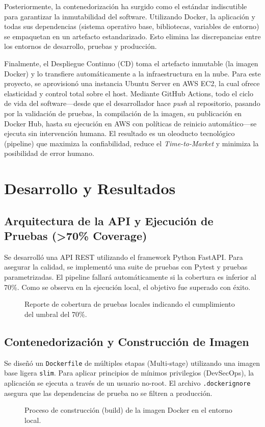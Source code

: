\documentclass[12pt, a4paper]{article}
\begin{document}
Posteriormente, la contenedorización ha surgido como el estándar indiscutible para garantizar la inmutabilidad del software. Utilizando Docker, la aplicación y todas sus dependencias (sistema operativo base, bibliotecas, variables de entorno) se empaquetan en un artefacto estandarizado. Esto elimina las discrepancias entre los entornos de desarrollo, pruebas y producción. 

Finalmente, el Despliegue Continuo (CD) toma el artefacto inmutable (la imagen Docker) y lo transfiere automáticamente a la infraestructura en la nube. Para este proyecto, se aprovisionó una instancia Ubuntu Server en AWS EC2, la cual ofrece elasticidad y control total sobre el host. Mediante GitHub Actions, todo el ciclo de vida del software—desde que el desarrollador hace \textit{push} al repositorio, pasando por la validación de pruebas, la compilación de la imagen, su publicación en Docker Hub, hasta su ejecución en AWS con políticas de reinicio automático—se ejecuta sin intervención humana. El resultado es un oleoducto tecnológico (pipeline) que maximiza la confiabilidad, reduce el \textit{Time-to-Market} y minimiza la posibilidad de error humano.

\section{Desarrollo y Resultados}

\subsection{Arquitectura de la API y Ejecución de Pruebas (>70\% Coverage)}
Se desarrolló una API REST utilizando el framework Python FastAPI. Para asegurar la calidad, se implementó una suite de pruebas con Pytest y pruebas parametrizadas. El pipeline fallará automáticamente si la cobertura es inferior al 70\%. Como se observa en la ejecución local, el objetivo fue superado con éxito.
\begin{figure}[H]
    \centering
    \caption{Reporte de cobertura de pruebas locales indicando el cumplimiento del umbral del 70\%.}
    \label{fig:coverage}
\end{figure}

\subsection{Contenedorización y Construcción de Imagen}
Se diseñó un \texttt{Dockerfile} de múltiples etapas (Multi-stage) utilizando una imagen base ligera \texttt{slim}. Para aplicar principios de mínimos privilegios (DevSecOps), la aplicación se ejecuta a través de un usuario no-root. El archivo \texttt{.dockerignore} asegura que las dependencias de prueba no se filtren a producción.
\begin{figure}[H]
    \centering
    \caption{Proceso de construcción (build) de la imagen Docker en el entorno local.}
    \label{fig:docker}
\end{figure}
\end{document}
